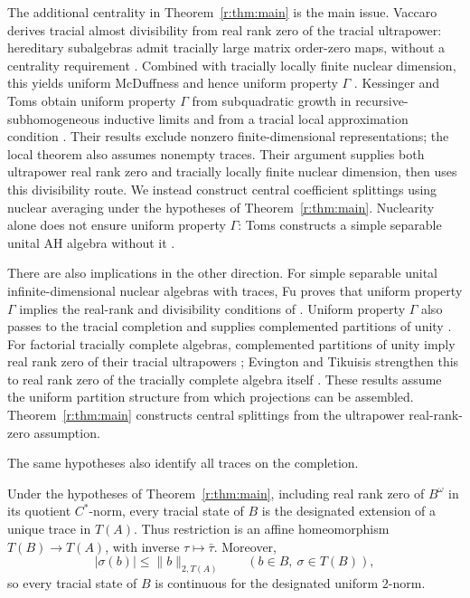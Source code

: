 The additional centrality in Theorem~\ref{r:thm:main} is the main issue.
Vaccaro derives tracial almost divisibility from real rank zero of the
tracial ultrapower: hereditary subalgebras admit tracially large matrix
order-zero maps, without a centrality requirement
\cite[Proposition~2.2]{Vac26}. Combined with tracially locally finite nuclear
dimension, this yields uniform McDuffness and hence uniform property
$\Gamma$ \cite[Theorem~2.3]{Vac26}. Kessinger and Toms obtain uniform
property $\Gamma$ from subquadratic growth in recursive-subhomogeneous
inductive limits and from a tracial local approximation condition
\cite[Theorems~1.2 and 7.11]{KT26}. Their results exclude nonzero
finite-dimensional representations; the local theorem also assumes
nonempty traces. Their argument supplies both ultrapower real rank zero
and tracially locally finite nuclear dimension, then uses this divisibility
route. We instead construct central coefficient splittings using
nuclear averaging under the hypotheses of Theorem~\ref{r:thm:main}.
Nuclearity alone does not ensure uniform property $\Gamma$: Toms constructs
a simple separable unital AH algebra without it \cite[Theorem~1]{Toms26}.

There are also implications in the other direction. For simple separable
unital infinite-dimensional nuclear algebras with traces, Fu proves that
uniform property $\Gamma$ implies the real-rank and divisibility
conditions of \cite[Theorems~1.1 and 10.6]{Fu26}.
Uniform property $\Gamma$ also passes to the tracial completion and
supplies complemented partitions of unity
\cite[Proposition~5.20 and Theorem~1.4]{CCEGSTW}.
For factorial tracially complete algebras, complemented partitions of unity
imply real rank zero of their tracial ultrapowers
\cite[Proposition~7.2]{CCEGSTW}; Evington and Tikuisis strengthen this to
real rank zero of the tracially complete algebra itself
\cite[Theorem~A]{EvingtonTikuisis26}. These results assume the uniform
partition structure from which projections can be assembled.
Theorem~\ref{r:thm:main} constructs central splittings from the ultrapower
real-rank-zero assumption.

The same hypotheses also identify all traces on the completion.

\begin{corollary}\label{r:cor:completion-traces}
Under the hypotheses of Theorem~\ref{r:thm:main}, including real rank zero
of $B^\omega$ in its quotient $C^*$-norm, every tracial state of $B$ is
the designated extension of a unique trace in $T(A)$. Thus restriction
is an affine homeomorphism $T(B)\to T(A)$, with inverse
$\tau\mapsto\bar\tau$. Moreover,
\[
 |\sigma(b)|\le\|b\|_{2,T(A)}
 \qquad(b\in B,\ \sigma\in T(B)),
\]
so every tracial state of $B$ is continuous for the designated uniform
$2$-norm.
\end{corollary}

